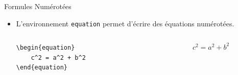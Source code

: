 \begin{frame}{Formules Numérotées}
  \begin{itemize}
    \item L'environnement \lstinline|equation| permet d'écrire des équations numérotées.
    \begin{columns}
      \begin{column}{0.5\textwidth}
        \begin{lstlisting}[style=nonumbers]
\begin{equation}
    c^2 = a^2 + b^2
\end{equation}
        \end{lstlisting}
      \end{column}
      \begin{column}{0.5\textwidth}
        \begin{equation}
                c^2 = a^2 + b^2
        \end{equation}
      \end{column}
    \end{columns}


\end{itemize}
\end{frame}
